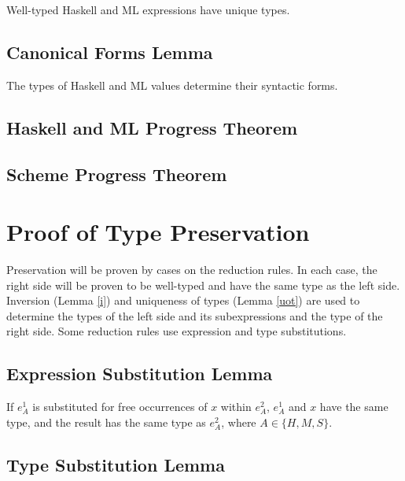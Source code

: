 Well-typed Haskell and ML expressions have unique types.



\subsection{Canonical Forms Lemma}

The types of Haskell and ML values determine their syntactic forms.



\subsection{Haskell and ML Progress Theorem}



\subsection{Scheme Progress Theorem}



\section{Proof of Type Preservation}

Preservation will be proven by cases on the reduction rules.  In each case, the right side will be proven to be well-typed and have the same type as the left side.  Inversion (Lemma \ref{i}) and uniqueness of types (Lemma \ref{uot}) are used to determine the types of the left side and its subexpressions and the type of the right side.  Some reduction rules use expression and type substitutions.

\subsection{Expression Substitution Lemma}

If $e_{A}^{1}$ is substituted for free occurrences of $x$ within $e_{A}^{2}$, $e_{A}^{1}$ and $x$ have the same type, and the result has the same type as $e_{A}^{2}$, where $A\in\lbrace H,M,S\rbrace$.



\subsection{Type Substitution Lemma}

